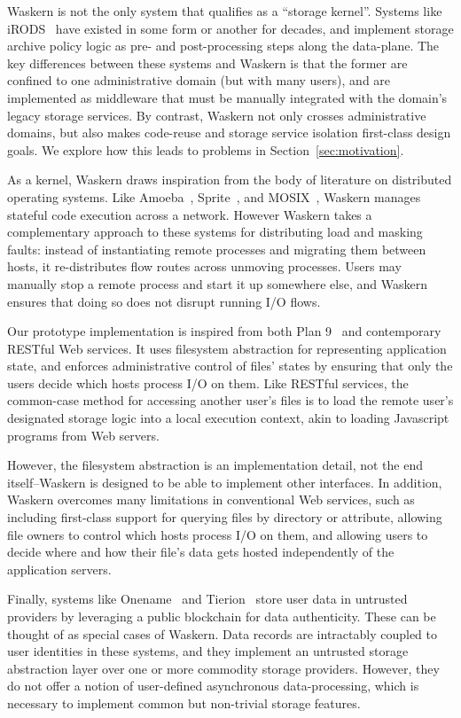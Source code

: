 Waskern is not the only system that qualifies as a ``storage kernel''.
Systems like iRODS~\cite{irods} have existed in some form or another for
decades, and implement storage archive policy logic as pre- and post-processing steps
along the data-plane.  The key differences between these systems and Waskern is
that the former are confined to one administrative domain (but with many users), and
are implemented as middleware that must be manually integrated with the domain's
legacy storage services.  By contrast, Waskern not only crosses administrative
domains, but also makes code-reuse and storage service isolation first-class
design goals.  We explore how this leads to problems in
Section~\ref{sec:motivation}.

As a kernel, Waskern draws inspiration from the body of literature on distributed
operating systems.  Like Amoeba~\cite{amoeba}, Sprite~\cite{sprite}, and
MOSIX~\cite{mosix}, Waskern manages stateful code
execution across a network.  However Waskern takes a complementary approach to
these systems for distributing load and masking faults:  instead of instantiating remote processes
and migrating them between hosts, it re-distributes flow routes across unmoving
processes.  Users may manually stop a remote process and start it up somewhere
else, and Waskern ensures that doing so does not disrupt running I/O flows.

Our prototype implementation is inspired from both Plan
9~\cite{plan9} and contemporary RESTful Web services.
It uses filesystem abstraction for representing
application state, and enforces administrative control of files' states by
ensuring that only the users decide which hosts process I/O on them.
Like RESTful services, the common-case method for accessing another user's files
is to load the remote user's designated storage logic into a local execution
context, akin to loading Javascript programs from Web servers.

However, the filesystem abstraction is an
implementation detail, not the end itself--Waskern is designed to be able to
implement other interfaces.  In addition, Waskern overcomes many
limitations in conventional Web services, such as including
first-class support for querying files by directory or attribute, allowing
file owners to control which hosts process I/O on them, and allowing users to
decide where and how their file's data gets hosted independently of the
application servers.

Finally, systems like Onename~\cite{onename} and Tierion~\cite{tierion}
store user data in untrusted providers by leveraging a public blockchain for
data authenticity.  These can be thought of as special cases of Waskern.  Data records are intractably coupled
to user identities in these systems, and they implement an untrusted storage abstraction layer over
one or more commodity storage providers.  However, they do not offer a notion of
user-defined asynchronous data-processing, which is necessary to implement common but
non-trivial storage features.

